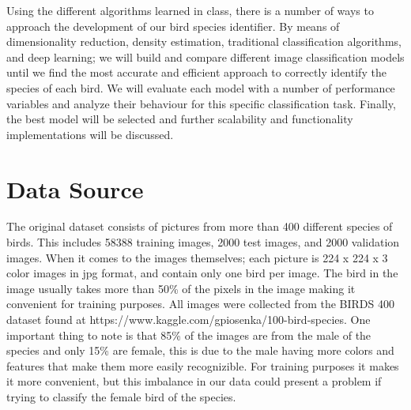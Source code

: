 \documentclass[11pt]{article}
\begin{document}
\begin{singlespace}
Using the different algorithms learned in class, there is a number of ways to approach the development of our bird species identifier. By means of dimensionality reduction, density estimation, traditional classification algorithms, and deep learning; we will build and compare different image classification models until we find the most accurate and efficient approach to correctly identify the species of each bird. We will evaluate each model with a number of performance variables and analyze their behaviour for this specific classification task. Finally, the best model will be selected and further scalability and functionality implementations will be discussed. 

\section{Data Source}

The original dataset consists of pictures from more than 400 different species of birds. This includes 58388 training images, 2000 test images, and 2000 validation images. When it comes to the images themselves; each picture is 224 x 224 x 3 color images in jpg format, and contain only one bird per image. The bird in the image usually takes more than 50\% of the pixels in the image making it convenient for training purposes. All images were collected from the BIRDS 400 dataset found at https://www.kaggle.com/gpiosenka/100-bird-species. One important thing to note is that 85\% of the images are from the male of the species and only 15\% are female, this is due to the male having more colors and features that make them more easily recognizible. For training purposes it makes it more convenient, but this imbalance in our data could present a problem if trying to classify the female bird of the species. \\

\begin{figure}
    \centering
    

\end{figure}
\end{singlespace}
\end{document}

